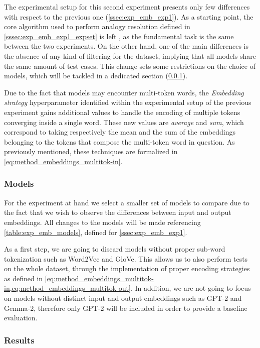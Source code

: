 The experimental setup for this second experiment presents only few differences with respect to the previous one (\cref{ssec:exp_emb_exp1}).
As a starting point, the core algorithm used to perform analogy resolution defined in \cref{sssec:exp_emb_exp1_expset} is left , as the fundamental task is the same between the two experiments.
On the other hand, one of the main differences is the absence of any kind of filtering for the dataset, implying that all models share the same amount of test cases.
This change  sets some restrictions on the choice of models, which will be tackled in a dedicated section (\cref{sssec:exp_emb_exp2_models}).

Due to the fact that models may encounter multi-token words, the \textit{Embedding strategy} hyperparameter identified within the experimental setup of the previous experiment gains additional values to handle the encoding of multiple tokens converging inside a single word.
These new values are \textit{average} and \textit{sum}, which correspond to taking respectively the mean and the sum of the embeddings belonging to the tokens that compose the multi-token word in question.
As previously mentioned, these techniques are formalized in \cref{eq:method_embeddings_multitok-in}.

\subsubsection{Models}\label{sssec:exp_emb_exp2_models}

For the experiment at hand we select a smaller set of models to compare due to the fact that we wish to observe the differences between input and output embeddings.
All changes to the models will be made referencing \cref{table:exp_emb_models}, defined for \cref{ssec:exp_emb_exp1}.

As a first step, we are going to discard models without proper sub-word tokenization such as Word2Vec and GloVe. 
This allows us to also perform tests on the whole dataset, through the implementation of proper encoding strategies as defined in \cref{eq:method_embeddings_multitok-in,eq:method_embeddings_multitok-out}.
In addition, we are not going to focus on models without distinct input and output embeddings such as GPT-2 and Gemma-2, therefore only GPT-2 will be included in order to provide a baseline evaluation.

\subsubsection{Results}

